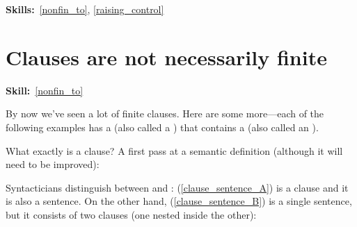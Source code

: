 \documentclass{article}
\begin{document}
\maketitle
\subtitle{Topic 9 Course Notes: Non-finite clauses Part 1\\
To-infinitives, Raising \& Control}
\hfill{}\textbf{Skills:}~\ref{nonfin_to},
\ref{raising_control}

\section{Clauses are not necessarily finite}
\hfill{}\textbf{Skill:}~\ref{nonfin_to}

By now we've seen a lot of finite clauses.
Here are some more---each of the following examples has a  (also called a ) that contains a  (also called an ).
\begin{exe}
\end{exe}

What exactly is a clause?
A first pass at a semantic definition (although it will need to be improved):
\begin{exe}
\end{exe}

Syntacticians distinguish between  and :
(\ref{clause_sentence_A}) is a clause and it is also a sentence. On the other hand, (\ref{clause_sentence_B}) is a single sentence, but it consists of two clauses (one nested inside the other):
\begin{exe}
\end{exe}
\end{document}
